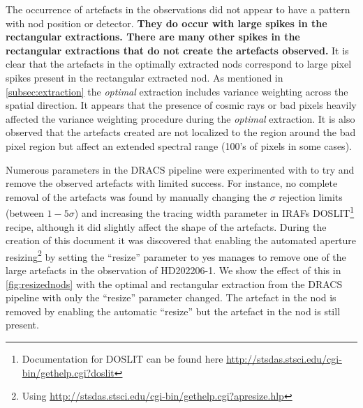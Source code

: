 The occurrence of artefacts in the observations did not appear to have a pattern with nod position or detector. \textbf{They do occur with large spikes in the rectangular extractions.
There are many other spikes in the rectangular extractions that do not create the artefacts observed.
}
It is clear that the artefacts in the optimally extracted nods correspond to large pixel spikes present in the rectangular extracted nod.
As mentioned in \cref{subsec:extraction} the \emph{optimal} extraction includes variance weighting across the spatial direction.
It appears that the presence of cosmic rays or bad pixels heavily affected the variance weighting procedure during the \emph{optimal} extraction.
It is also observed that the artefacts created are not localized to the region around the bad pixel region but affect an extended spectral range (100's of pixels in some cases).

Numerous parameters in the {DRACS} pipeline were experimented with to try and remove the observed artefacts with limited success.
For instance, no complete removal of the artefacts was found by manually changing the \(\sigma\) rejection limits (between \(1-5 \sigma\)) and increasing the tracing width parameter in {IRAF}s DOSLIT\footnote{Documentation for DOSLIT can be found here \href{http://stsdas.stsci.edu/cgi-bin/gethelp.cgi?doslit}{http://stsdas.stsci.edu/cgi-bin/gethelp.cgi?doslit}} recipe, although it did slightly affect the shape of the artefacts.
During the creation of this document it was discovered that enabling the automated aperture resizing\footnote{Using \href{apresize}{http://stsdas.stsci.edu/cgi-bin/gethelp.cgi?apresize.hlp}} by setting the ``resize'' parameter to yes manages to remove one of the large artefacts in the observation of {HD202206-1}.
We show the effect of this in \cref{fig:resizednods} with the optimal and rectangular extraction from the {DRACS} pipeline with only the ``resize'' parameter changed.
The artefact in the  nod is removed by enabling the automatic ``resize'' but the artefact in the  nod is still present.

